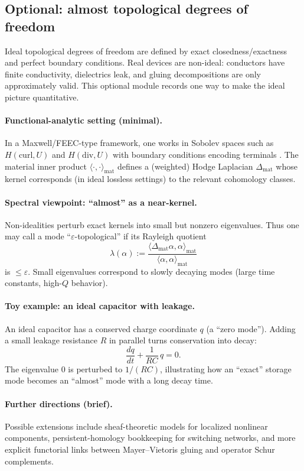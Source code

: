 \documentclass[11pt]{article}
\begin{document}
\subsection{Optional: almost topological degrees of freedom}
\label{sec:almost-topological}
Ideal topological degrees of freedom are defined by exact closedness/exactness and perfect boundary conditions.
Real devices are non-ideal: conductors have finite conductivity, dielectrics leak, and gluing decompositions are only approximately valid.
This optional module records one way to make the ideal picture quantitative.

\paragraph{Functional-analytic setting (minimal).}
In a Maxwell/FEEC-type framework, one works in Sobolev spaces such as $H(\mathrm{curl},U)$ and $H(\mathrm{div},U)$ with boundary conditions encoding terminals \cite{arnold_falk_winther_2010_feec}.
The material inner product $\langle\cdot,\cdot\rangle_{\mathrm{mat}}$ defines a (weighted) Hodge Laplacian $\Delta_{\mathrm{mat}}$ whose kernel corresponds (in ideal lossless settings) to the relevant cohomology classes.

\paragraph{Spectral viewpoint: ``almost'' as a near-kernel.}
Non-idealities perturb exact kernels into small but nonzero eigenvalues.
Thus one may call a mode ``$\varepsilon$-topological'' if its Rayleigh quotient
\[
\lambda(\alpha):=\frac{\langle \Delta_{\mathrm{mat}}\alpha,\alpha\rangle_{\mathrm{mat}}}{\langle \alpha,\alpha\rangle_{\mathrm{mat}}}
\]
is $\le \varepsilon$.
Small eigenvalues correspond to slowly decaying modes (large time constants, high-$Q$ behavior).

\paragraph{Toy example: an ideal capacitor with leakage.}
An ideal capacitor has a conserved charge coordinate $q$ (a ``zero mode'').
Adding a small leakage resistance $R$ in parallel turns conservation into decay:
\[
\frac{dq}{dt} + \frac{1}{RC}\,q = 0.
\]
The eigenvalue $0$ is perturbed to $1/(RC)$, illustrating how an ``exact'' storage mode becomes an ``almost'' mode with a long decay time.

\paragraph{Further directions (brief).}
Possible extensions include sheaf-theoretic models for localized nonlinear components, persistent-homology bookkeeping for switching networks, and more explicit functorial links between Mayer--Vietoris gluing and operator Schur complements.
\end{document}
